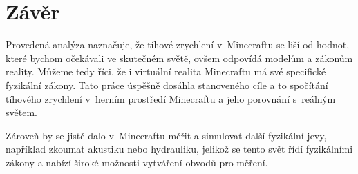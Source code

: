 \documentclass[a4paper, twoside]{article}
\begin{document}
\section{Závěr}
Provedená analýza naznačuje, že tíhové zrychlení v~Minecraftu se liší od hodnot, které bychom očekávali ve skutečném světě, ovšem odpovídá modelům a zákonům reality. Můžeme tedy říci, že i virtuální realita Minecraftu má své specifické fyzikální zákony. Tato práce úspěšně dosáhla stanoveného cíle a to spočítání tíhového zrychlení v~herním prostředí Minecraftu a jeho porovnání s~reálným světem.

Zároveň by se jistě dalo v~Minecraftu měřit a simulovat další fyzikální jevy, například zkoumat akustiku nebo hydrauliku, jelikož se tento svět řídí fyzikálními zákony a nabízí široké možnosti vytváření obvodů pro měření.







\newpage
\listoffigures 
\end{document}
